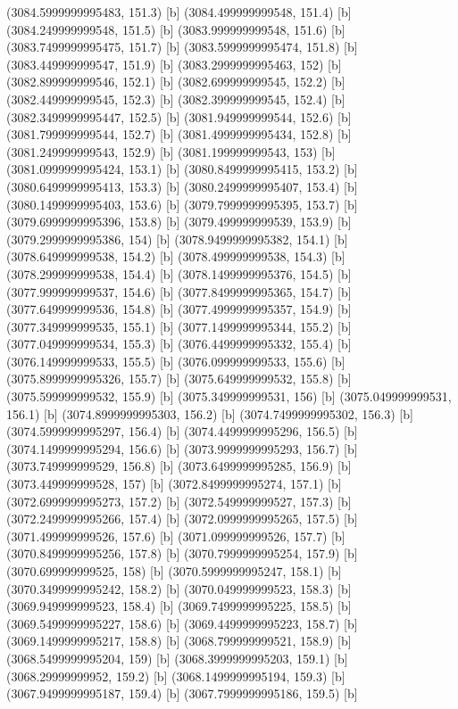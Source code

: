 {{{(3084.5999999995483, 151.3) [b] 
(3084.499999999548, 151.4) [b] 
(3084.249999999548, 151.5) [b] 
(3083.999999999548, 151.6) [b] 
(3083.7499999995475, 151.7) [b] 
(3083.5999999995474, 151.8) [b] 
(3083.449999999547, 151.9) [b] 
(3083.2999999995463, 152) [b] 
(3082.899999999546, 152.1) [b] 
(3082.699999999545, 152.2) [b] 
(3082.449999999545, 152.3) [b] 
(3082.399999999545, 152.4) [b] 
(3082.3499999995447, 152.5) [b] 
(3081.949999999544, 152.6) [b] 
(3081.799999999544, 152.7) [b] 
(3081.4999999995434, 152.8) [b] 
(3081.249999999543, 152.9) [b] 
(3081.199999999543, 153) [b] 
(3081.0999999995424, 153.1) [b] 
(3080.8499999995415, 153.2) [b] 
(3080.6499999995413, 153.3) [b] 
(3080.2499999995407, 153.4) [b] 
(3080.1499999995403, 153.6) [b] 
(3079.7999999995395, 153.7) [b] 
(3079.6999999995396, 153.8) [b] 
(3079.499999999539, 153.9) [b] 
(3079.2999999995386, 154) [b] 
(3078.9499999995382, 154.1) [b] 
(3078.649999999538, 154.2) [b] 
(3078.499999999538, 154.3) [b] 
(3078.299999999538, 154.4) [b] 
(3078.1499999995376, 154.5) [b] 
(3077.999999999537, 154.6) [b] 
(3077.8499999995365, 154.7) [b] 
(3077.649999999536, 154.8) [b] 
(3077.4999999995357, 154.9) [b] 
(3077.349999999535, 155.1) [b] 
(3077.1499999995344, 155.2) [b] 
(3077.049999999534, 155.3) [b] 
(3076.4499999995332, 155.4) [b] 
(3076.149999999533, 155.5) [b] 
(3076.099999999533, 155.6) [b] 
(3075.8999999995326, 155.7) [b] 
(3075.649999999532, 155.8) [b] 
(3075.599999999532, 155.9) [b] 
(3075.349999999531, 156) [b] 
(3075.049999999531, 156.1) [b] 
(3074.8999999995303, 156.2) [b] 
(3074.7499999995302, 156.3) [b] 
(3074.5999999995297, 156.4) [b] 
(3074.4499999995296, 156.5) [b] 
(3074.1499999995294, 156.6) [b] 
(3073.9999999995293, 156.7) [b] 
(3073.749999999529, 156.8) [b] 
(3073.6499999995285, 156.9) [b] 
(3073.449999999528, 157) [b] 
(3072.8499999995274, 157.1) [b] 
(3072.6999999995273, 157.2) [b] 
(3072.549999999527, 157.3) [b] 
(3072.2499999995266, 157.4) [b] 
(3072.0999999995265, 157.5) [b] 
(3071.499999999526, 157.6) [b] 
(3071.099999999526, 157.7) [b] 
(3070.8499999995256, 157.8) [b] 
(3070.7999999995254, 157.9) [b] 
(3070.699999999525, 158) [b] 
(3070.5999999995247, 158.1) [b] 
(3070.3499999995242, 158.2) [b] 
(3070.049999999523, 158.3) [b] 
(3069.949999999523, 158.4) [b] 
(3069.7499999995225, 158.5) [b] 
(3069.5499999995227, 158.6) [b] 
(3069.4499999995223, 158.7) [b] 
(3069.1499999995217, 158.8) [b] 
(3068.799999999521, 158.9) [b] 
(3068.5499999995204, 159) [b] 
(3068.3999999995203, 159.1) [b] 
(3068.29999999952, 159.2) [b] 
(3068.1499999995194, 159.3) [b] 
(3067.9499999995187, 159.4) [b] 
(3067.7999999995186, 159.5) [b] 
}}}
